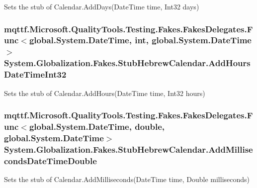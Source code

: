 Sets the stub of Calendar.\-Add\-Days(\-Date\-Time time, Int32 days)

\hypertarget{class_system_1_1_globalization_1_1_fakes_1_1_stub_hebrew_calendar_af79acbcdb713579a7579074cf26275c3}{
\subsubsection[{Add\-Hours\-Date\-Time\-Int32}]{\setlength{\rightskip}{0pt plus 5cm}mqttf.\-Microsoft.\-Quality\-Tools.\-Testing.\-Fakes.\-Fakes\-Delegates.\-Func$<$global.\-System.\-Date\-Time, int, global.\-System.\-Date\-Time$>$ System.\-Globalization.\-Fakes.\-Stub\-Hebrew\-Calendar.\-Add\-Hours\-Date\-Time\-Int32}}\label{class_system_1_1_globalization_1_1_fakes_1_1_stub_hebrew_calendar_af79acbcdb713579a7579074cf26275c3}


Sets the stub of Calendar.\-Add\-Hours(\-Date\-Time time, Int32 hours)

\hypertarget{class_system_1_1_globalization_1_1_fakes_1_1_stub_hebrew_calendar_a3101649e2e134796c6a68253c583d804}{
\subsubsection[{Add\-Milliseconds\-Date\-Time\-Double}]{\setlength{\rightskip}{0pt plus 5cm}mqttf.\-Microsoft.\-Quality\-Tools.\-Testing.\-Fakes.\-Fakes\-Delegates.\-Func$<$global.\-System.\-Date\-Time, double, global.\-System.\-Date\-Time$>$ System.\-Globalization.\-Fakes.\-Stub\-Hebrew\-Calendar.\-Add\-Milliseconds\-Date\-Time\-Double}}\label{class_system_1_1_globalization_1_1_fakes_1_1_stub_hebrew_calendar_a3101649e2e134796c6a68253c583d804}


Sets the stub of Calendar.\-Add\-Milliseconds(\-Date\-Time time, Double milliseconds)

